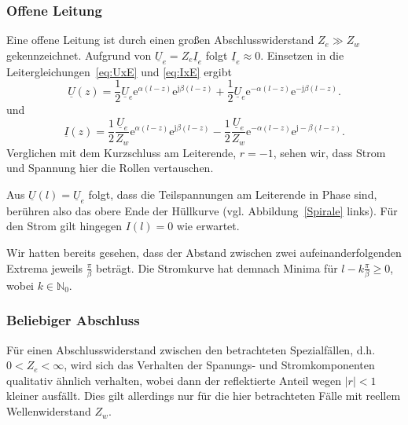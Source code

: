 \documentclass[paper=a4, parskip=half-, ngerman, fontsize=11pt]{scrreprt}
\begin{document}
\subsubsection{Offene Leitung}
Eine offene Leitung ist durch einen großen Abschlusswiderstand $Z_{e} \gg Z_{w}$ gekennzeichnet. Aufgrund von
$\underline{U}_{e} = Z_{e} \underline{I}_{e}$ folgt $\underline{I}_{e} \approx 0$. Einsetzen in die
Leitergleichungen~\eqref{eq:UxE} und \eqref{eq:IxE} ergibt
\begin{equation*}
\underline{U}(z) =
\frac{1}{2} \underline{U}_{e} \mathrm{e}^{\alpha (l - z)} \mathrm{e}^{\mathrm{j} \beta (l - z)}
+
\frac{1}{2} \underline{U}_{e} \mathrm{e}^{- \alpha (l - z)} \mathrm{e}^{- \mathrm{j} \beta (l - z)}.
\end{equation*}
und
\begin{equation*}
\underline{I}(z) =
\frac{1}{2} \frac{\underline{U}_{e}}{Z_{w}} \mathrm{e}^{\alpha (l - z)} \mathrm{e}^{\mathrm{j} \beta (l - z)}
-
\frac{1}{2} \frac{\underline{U}_{e}}{Z_{w}} \mathrm{e}^{- \alpha (l - z)} \mathrm{e}^{\mathrm{j} -\beta (l - z)}.
\end{equation*}
Verglichen mit dem Kurzschluss am Leiterende, $r=-1$, sehen wir, dass Strom und Spannung hier die Rollen vertauschen.

Aus $\underline{U}(l) = \underline{U}_{e}$ folgt, dass die Teilspannungen am Leiterende in Phase sind, berühren also
das obere Ende der Hüllkurve (vgl. Abbildung~\ref{Spirale} links). Für den Strom gilt hingegen $I(l) = 0$ wie erwartet.

Wir hatten bereits gesehen, dass der Abstand zwischen zwei aufeinanderfolgenden Extrema jeweils $\frac{\pi}{\beta}$
beträgt. Die Stromkurve hat demnach Minima für $l - k \frac{\pi}{\beta} \ge 0$, wobei $k \in \mathbb{N}_{0}$.



\subsubsection{Beliebiger Abschluss}
Für einen Abschlusswiderstand zwischen den betrachteten Spezialfällen, d.h. $0 < Z_{e} < \infty$, wird sich das
Verhalten der Spanungs- und Stromkomponenten qualitativ ähnlich verhalten, wobei dann der reflektierte Anteil wegen
$\left| r \right| < 1$ kleiner ausfällt. Dies gilt allerdings nur für die hier betrachteten Fälle mit reellem
Wellenwiderstand $Z_{w}$.
\end{document}
